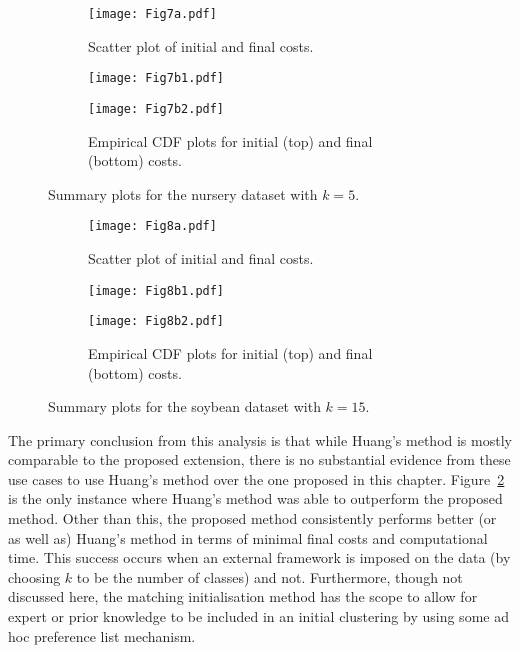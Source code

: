 \begin{figure}
    \begin{subfigure}{.5\textwidth}
        \texttt{[image: Fig7a.pdf]}
        \caption{Scatter plot of initial and final costs.}
    \end{subfigure}
    \hfill%
    \begin{subfigure}{.5\textwidth}
        \texttt{[image: Fig7b1.pdf]}

        \texttt{[image: Fig7b2.pdf]}
        \caption{Empirical CDF plots for initial (top) and final (bottom)
                 costs.}
    \end{subfigure}
    \caption{Summary plots for the nursery dataset with \(k=5\).}%
    \label{fig:nursery_nclasses}
\end{figure}

\begin{figure}
    \begin{subfigure}{.5\textwidth}
        \texttt{[image: Fig8a.pdf]}
        \caption{Scatter plot of initial and final costs.}
    \end{subfigure}
    \hfill%
    \begin{subfigure}{.5\textwidth}
        \texttt{[image: Fig8b1.pdf]}

        \texttt{[image: Fig8b2.pdf]}
        \caption{Empirical CDF plots for initial (top) and final (bottom)
                 costs.}
    \end{subfigure}
    \caption{Summary plots for the soybean dataset with \(k=15\).}%
    \label{fig:soybean_nclasses}
\end{figure}

The primary conclusion from this analysis is that while Huang's method is mostly
comparable to the proposed extension, there is no substantial evidence from
these use cases to use Huang's method over the one proposed in this chapter.
Figure~\ref{fig:soybean_nclasses} is the only instance where Huang's method was
able to outperform the proposed method. Other than this, the proposed method
consistently performs better (or as well as) Huang's method in terms of minimal
final costs and computational time. This success occurs when an external
framework is imposed on the data (by choosing \(k\) to be the number of classes)
and not. Furthermore, though not discussed here, the matching initialisation
method has the scope to allow for expert or prior knowledge to be included in an
initial clustering by using some ad hoc preference list mechanism.

